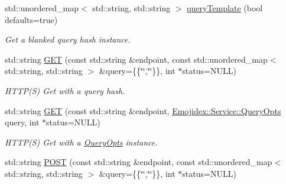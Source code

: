 \begin{DoxyCompactItemize}
\item 
std\+::unordered\+\_\+map$<$ std\+::string, std\+::string $>$ \hyperlink{classEmojidex_1_1Service_1_1Transactor_acdd10d6f4321b7a221c4bfb0d8590ff2}{query\+Template} (bool defaults=true)\hypertarget{classEmojidex_1_1Service_1_1Transactor_acdd10d6f4321b7a221c4bfb0d8590ff2}{}\label{classEmojidex_1_1Service_1_1Transactor_acdd10d6f4321b7a221c4bfb0d8590ff2}

\begin{DoxyCompactList}\small\item\em Get a blanked query hash instance. \end{DoxyCompactList}\item 
std\+::string \hyperlink{classEmojidex_1_1Service_1_1Transactor_ad7db57d801c905c92ea81d0ae8e565b7}{G\+ET} (const std\+::string \&endpoint, const std\+::unordered\+\_\+map$<$ std\+::string, std\+::string $>$ \&query=\{\{\char`\"{}\char`\"{},\char`\"{}\char`\"{}\}\}, int $\ast$status=N\+U\+LL)\hypertarget{classEmojidex_1_1Service_1_1Transactor_ad7db57d801c905c92ea81d0ae8e565b7}{}\label{classEmojidex_1_1Service_1_1Transactor_ad7db57d801c905c92ea81d0ae8e565b7}

\begin{DoxyCompactList}\small\item\em H\+T\+T\+P(\+S) Get with a query hash. \end{DoxyCompactList}\item 
std\+::string \hyperlink{classEmojidex_1_1Service_1_1Transactor_aa21e59443304d5e9612981f4d7df4e8c}{G\+ET} (const std\+::string \&endpoint, \hyperlink{classEmojidex_1_1Service_1_1QueryOpts}{Emojidex\+::\+Service\+::\+Query\+Opts} query, int $\ast$status=N\+U\+LL)\hypertarget{classEmojidex_1_1Service_1_1Transactor_aa21e59443304d5e9612981f4d7df4e8c}{}\label{classEmojidex_1_1Service_1_1Transactor_aa21e59443304d5e9612981f4d7df4e8c}

\begin{DoxyCompactList}\small\item\em H\+T\+T\+P(\+S) Get with a \hyperlink{classEmojidex_1_1Service_1_1QueryOpts}{Query\+Opts} instance. \end{DoxyCompactList}\item 
std\+::string \hyperlink{classEmojidex_1_1Service_1_1Transactor_a5335a34c16a0d16bb0196fda4754b611}{P\+O\+ST} (const std\+::string \&endpoint, const std\+::unordered\+\_\+map$<$ std\+::string, std\+::string $>$ \&query=\{\{\char`\"{}\char`\"{},\char`\"{}\char`\"{}\}\}, int $\ast$status=N\+U\+LL)\hypertarget{classEmojidex_1_1Service_1_1Transactor_a5335a34c16a0d16bb0196fda4754b611}{}\label{classEmojidex_1_1Service_1_1Transactor_a5335a34c16a0d16bb0196fda4754b611}


\end{DoxyCompactItemize}
